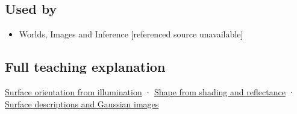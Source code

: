 \subsection{Used by}\label{appendix-89b2d5b7c9e1-used-by}

\begin{itemize}
\tightlist
\item
  {Worlds, Images and Inference {[}referenced source unavailable{]}}
\end{itemize}

\subsection{Full teaching explanation}\label{appendix-89b2d5b7c9e1-full-teaching-explanation}

\hyperref[04-visual-computing-ii-ch032-surface-orientation-from-illumination]{Surface orientation from illumination} · \hyperref[04-visual-computing-ii-ch032-shape-from-shading-and-reflectance]{Shape from shading and reflectance} · \hyperref[04-visual-computing-ii-ch032-surface-descriptions-and-gaussian-images]{Surface descriptions and Gaussian images}

